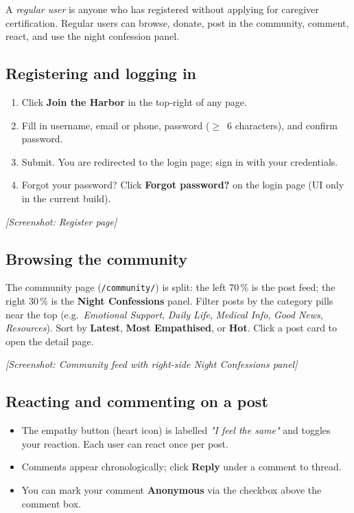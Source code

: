 A \emph{regular user} is anyone who has registered without applying for
caregiver certification. Regular users can browse, donate, post in the
community, comment, react, and use the night confession panel.

\subsection{Registering and logging in}
\begin{enumerate}
  \item Click \textbf{Join the Harbor} in the top-right of any page.
  \item Fill in username, email or phone, password ($\geq$~6 characters),
        and confirm password.
  \item Submit. You are redirected to the login page; sign in with your
        credentials.
  \item Forgot your password? Click \textbf{Forgot password?} on the
        login page (UI only in the current build).
\end{enumerate}

\textit{[Screenshot: Register page]}

\subsection{Browsing the community}
The community page (\texttt{/community/}) is split: the left 70\,\% is
the post feed; the right 30\,\% is the \textbf{Night Confessions} panel.
Filter posts by the category pills near the top (e.g.\ \emph{Emotional
Support}, \emph{Daily Life}, \emph{Medical Info}, \emph{Good News},
\emph{Resources}). Sort by \textbf{Latest}, \textbf{Most Empathised}, or
\textbf{Hot}. Click a post card to open the detail page.

\textit{[Screenshot: Community feed with right-side Night Confessions
panel]}

\subsection{Reacting and commenting on a post}
\begin{itemize}
  \item The empathy button (heart icon) is labelled \emph{"I feel the
        same"} and toggles your reaction. Each user can react once per
        post.
  \item Comments appear chronologically; click \textbf{Reply} under a
        comment to thread.
  \item You can mark your comment \textbf{Anonymous} via the checkbox
        above the comment box.
\end{itemize}

